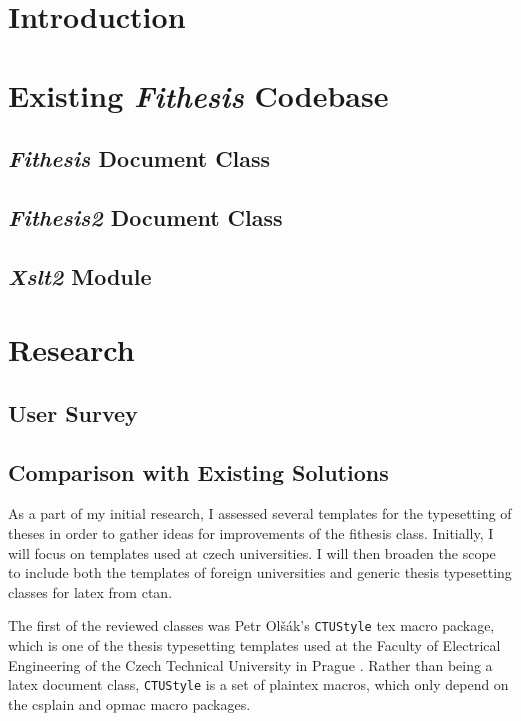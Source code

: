 \documentclass{article}
\begin{document}
  
  \tableofcontents
  \listoftables
  \listoffigures
  \newpage

  \section{Introduction}
  \section{Existing \emph{Fithesis} Codebase}
  \subsection{\emph{Fithesis} Document Class}
  \subsection{\emph{Fithesis2} Document Class}
  \subsection{\emph{Xslt2} Module}
  \section{Research}
  \subsection{User Survey}
  \subsection{Comparison with Existing Solutions}
  As a part of my initial research, I assessed several templates for the typesetting of theses in order to gather ideas for improvements of the fithesis class. Initially, I will focus on templates used at czech universities. I will then broaden the scope to include both the templates of foreign universities and generic thesis typesetting classes for \gls{latex} from \gls{ctan}.

  The first of the reviewed classes was Petr Olšák's \texttt{CTUStyle} \gls{tex} macro package, which is one of the thesis typesetting templates used at the Faculty of Electrical Engineering of the Czech Technical University in Prague \cite{Olsak13}. Rather than being a \gls{latex} document class, \texttt{CTUStyle} is a set of plain\gls{tex} macros, which only depend on the \gls{csplain} and \gls{opmac} macro packages.
\end{document}
